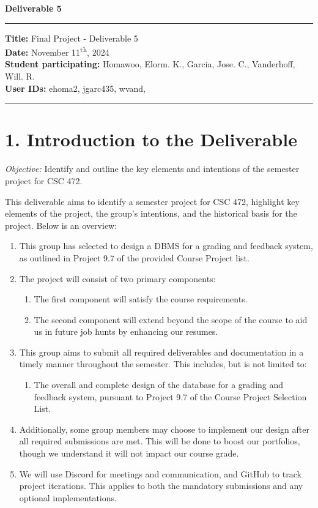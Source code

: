 \documentclass[12pt]{article}
\begin{document}
\begin{center}
    \Large\textbf{Deliverable 5}
\end{center}
\vspace{0.5em}
\hrule
\vspace{1em}

\noindent
\textbf{Title:} Final Project - Deliverable 5 \\
\textbf{Date:} November 11\textsuperscript{th}, 2024 \\
\textbf{Student participating: } Homawoo, Elorm. K., Garcia, Jose. C., Vanderhoff, Will. R. \\
\textbf{User IDs:}  ehoma2, jgarc435, wvand,\\
\vspace{1em}
\hrule

\section*{1. Introduction to the Deliverable}

\noindent
\textit{Objective:} Identify and outline the key elements and intentions of the semester project for CSC 472.

\noindent
This deliverable aims to identify a semester project for CSC 472, highlight key elements of the project, the group’s intentions, and the historical basis for the project. Below is an overview:

\begin{enumerate}
    \item This group has selected to design a DBMS for a grading and feedback system, as outlined in Project 9.7 of the provided Course Project list.
    \item The project will consist of two primary components:
    \begin{enumerate}
        \item The first component will satisfy the course requirements.
        \item The second component will extend beyond the scope of the course to aid us in future job hunts by enhancing our resumes.
    \end{enumerate}
    \item This group aims to submit all required deliverables and documentation in a timely manner throughout the semester. This includes, but is not limited to:
    \begin{enumerate}
        \item The overall and complete design of the database for a grading and feedback system, pursuant to Project 9.7 of the Course Project Selection List.
    \end{enumerate}
    \item Additionally, some group members may choose to implement our design after all required submissions are met. This will be done to boost our portfolios, though we understand it will not impact our course grade.
    \item We will use Discord for meetings and communication, and GitHub to track project iterations. This applies to both the mandatory submissions and any optional implementations.
\end{enumerate}
\end{document}

